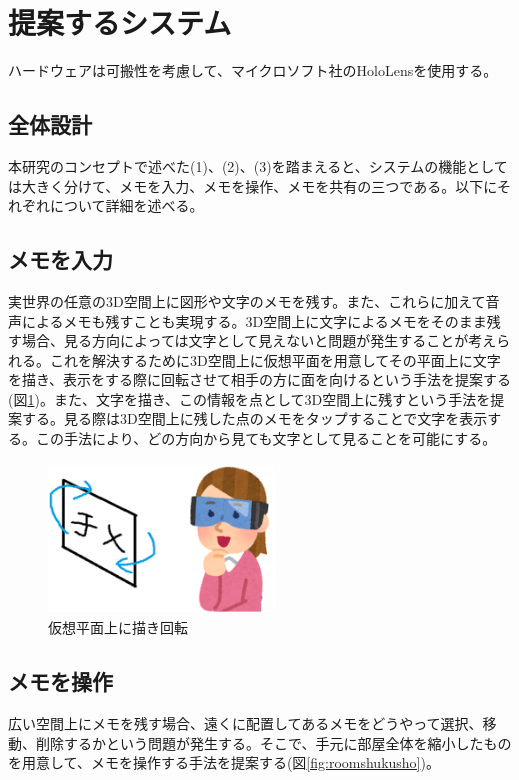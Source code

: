 \documentclass[twocolumn, a4paper]{UECIEresume}
\begin{document}
\section{提案するシステム}
ハードウェアは可搬性を考慮して、マイクロソフト社のHoloLens\cite{tex6}を使用する。

\subsection{全体設計}
本研究のコンセプトで述べた(1)、(2)、(3)を踏まえると、システムの機能としては大きく分けて、メモを入力、メモを操作、メモを共有の三つである。以下にそれぞれについて詳細を述べる。

\subsection{メモを入力}
実世界の任意の3D空間上に図形や文字のメモを残す。また、これらに加えて音声によるメモも残すことも実現する。3D空間上に文字によるメモをそのまま残す場合、見る方向によっては文字として見えないと問題が発生することが考えられる。これを解決するために3D空間上に仮想平面を用意してその平面上に文字を描き、表示をする際に回転させて相手の方に面を向けるという手法を提案する(図\ref{fig:memokaiten})。また、文字を描き、この情報を点として3D空間上に残すという手法を提案する。見る際は3D空間上に残した点のメモをタップすることで文字を表示する。この手法により、どの方向から見ても文字として見ることを可能にする。

\begin{figure}[h]
  \begin{center}
    \includegraphics[clip,height=4.0cm,width=6.0cm]{./memokaiten.eps}
    \caption{仮想平面上に描き回転}
    \label{fig:memokaiten}
  \end{center}
\end{figure}


\subsection{メモを操作}
広い空間上にメモを残す場合、遠くに配置してあるメモをどうやって選択、移動、削除するかという問題が発生する。そこで、手元に部屋全体を縮小したものを用意して、メモを操作する手法を提案する(図\ref{fig:roomshukusho})。
\end{document}

